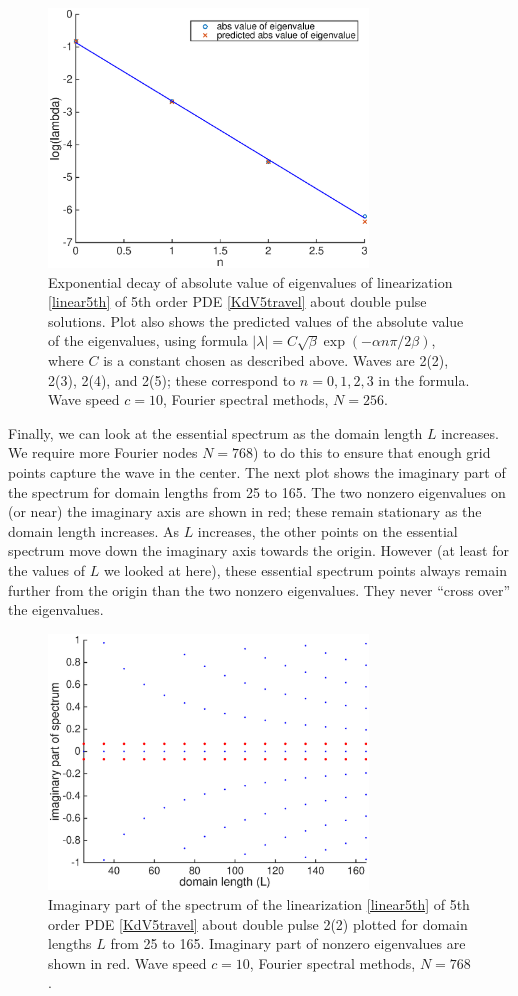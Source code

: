 \documentclass[12pt]{article}
\begin{document}
\begin{figure}[H]
	\includegraphics[width=8.5cm]{decayeigenvalue}
	\caption{Exponential decay of absolute value of eigenvalues of linearization \eqref{linear5th} of 5th order PDE \eqref{KdV5travel} about double pulse solutions. Plot also shows the predicted values of the absolute value of the eigenvalues, using formula $|\lambda| = C \sqrt{\beta}\exp{(-\alpha n \pi / 2 \beta)}$, where $C$ is a constant chosen as described above. Waves are 2(2), 2(3), 2(4), and 2(5); these correspond to $n = 0, 1, 2, 3$ in the formula. Wave speed $c = 10$, Fourier spectral methods, $N = 256$.}
\end{figure}

Finally, we can look at the essential spectrum as the domain length $L$ increases. We require more Fourier nodes $N = 768$) to do this to ensure that enough grid points capture the wave in the center. The next plot shows the imaginary part of the spectrum for domain lengths from 25 to 165. The two nonzero eigenvalues on (or near) the imaginary axis are shown in red; these remain stationary as the domain length increases. As $L$ increases, the other points on the essential spectrum move down the imaginary axis towards the origin. However (at least for the values of $L$ we looked at here), these essential spectrum points always remain further from the origin than the two nonzero eigenvalues. They never ``cross over'' the eigenvalues.

\begin{figure}[H]
	\includegraphics[width=8.5cm]{essspecL}
	\caption{Imaginary part of the spectrum of the linearization \eqref{linear5th} of 5th order PDE \eqref{KdV5travel} about double pulse 2(2) plotted for domain lengths $L$ from 25 to 165. Imaginary part of nonzero eigenvalues are shown in red. Wave speed $c = 10$, Fourier spectral methods, $N = 768$.}
\end{figure}
\end{document}
